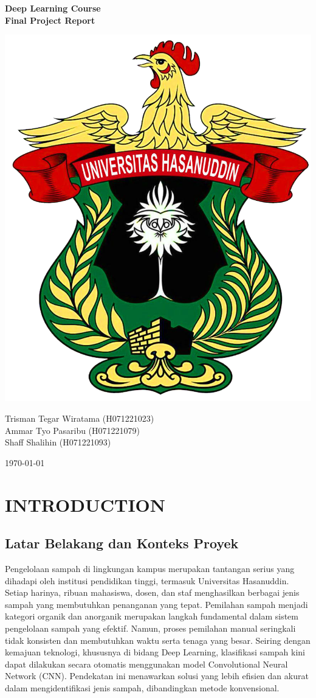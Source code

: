 \documentclass[12pt,a4paper]{article}
\begin{document}
\begin{titlepage}
    \centering
    {\Large\textbf{Deep Learning Course \\ Final Project Report}\par} %
    \vspace{2cm} %
    \includegraphics[width=0.5\linewidth]{Images/logounhas.png}\par %
    \vspace{2cm} %
    {\large
    Trisman Tegar Wiratama (H071221023)\\ 
    Ammar Tyo Pasaribu (H071221079)\\ 
    Shaff Shalihin (H071221093)\par}
    \vspace{1cm} %
    {\large\today\par} %
\end{titlepage}

\normalsize  %
\tableofcontents
\newpage

\section{INTRODUCTION}
\subsection{Latar Belakang dan Konteks Proyek}
\begin{adjustwidth}{3em}{0pt} 
\hspace{0.5cm} Pengelolaan sampah di lingkungan kampus merupakan tantangan serius yang dihadapi oleh institusi pendidikan tinggi, termasuk Universitas Hasanuddin. Setiap harinya, ribuan mahasiswa, dosen, dan staf menghasilkan berbagai jenis sampah yang membutuhkan penanganan yang tepat. Pemilahan sampah menjadi kategori organik dan anorganik merupakan langkah fundamental dalam sistem pengelolaan sampah yang efektif. Namun, proses pemilahan manual seringkali tidak konsisten dan membutuhkan waktu serta tenaga yang besar. Seiring dengan kemajuan teknologi, khususnya di bidang Deep Learning, klasifikasi sampah kini dapat dilakukan secara otomatis menggunakan model Convolutional Neural Network (CNN). Pendekatan ini menawarkan solusi yang lebih efisien dan akurat dalam mengidentifikasi jenis sampah, dibandingkan metode konvensional. \end{adjustwidth}
\
\end{document}
